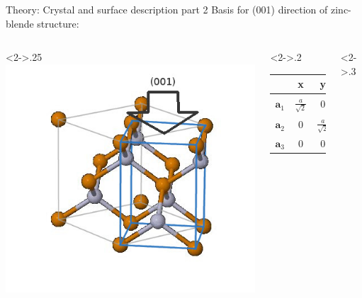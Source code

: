\begin{frame}{Theory: Crystal and surface description part 2}
	Basis for (001) direction of zinc-blende structure: 
	\begin{columns}
		\hspace{-1cm}
		\begin{column}<2->{.25\linewidth}
			\includegraphics[width=1.2\linewidth]{andere_bilder/zinc_blende_45degree.jpg}
		\end{column}
		\hspace{-1cm}
		\begin{column}<2->{.2\linewidth}\scriptsize{
			\begin{tabular}{c c c c} 
				\hline
				& \textbf{x} & \textbf{y} & \textbf{z}\\ 
				\hline 
				\vspace{0.2cm} 
				$\boldsymbol{a}_1$ & $\frac{a}{\sqrt{2}}$  & 0 & 0 \\
				\vspace{0.2cm}
				$\boldsymbol{a}_2$ & 0 & $\frac{a}{\sqrt{2}}$ & 0 \\
				\vspace{0.2cm}
				$\boldsymbol{a}_3$ & 0 & 0 & $a$ 
			\end{tabular}
		}	
		\end{column}
		\begin{column}<2->{.3\linewidth}\scriptsize{
			\begin{tabular}{c c c c} 

\end{tabular}}
\end{column}
\end{columns}
\end{frame}

